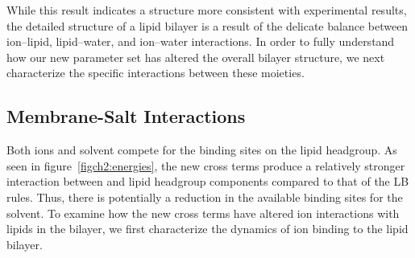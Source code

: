 While this result indicates a structure more consistent with experimental results, 
the detailed structure of a lipid bilayer is a result of the
delicate balance between ion--lipid, lipid--water, and ion--water interactions.
In order to fully understand how our new parameter set has altered the
overall bilayer structure, we next characterize the specific interactions
between these moieties.

\subsection{Membrane-Salt Interactions}

Both ions and solvent compete for the binding sites on the lipid headgroup. 
As seen in figure~\ref{figch2:energies}, the new cross terms
produce a relatively stronger interaction between \na and lipid
headgroup components compared to that of the LB rules. 
Thus, there is potentially a reduction in the available binding sites for the solvent. 
To examine how the new cross terms have altered ion interactions with lipids in the bilayer, 
we first characterize the dynamics of ion binding to the lipid bilayer.

